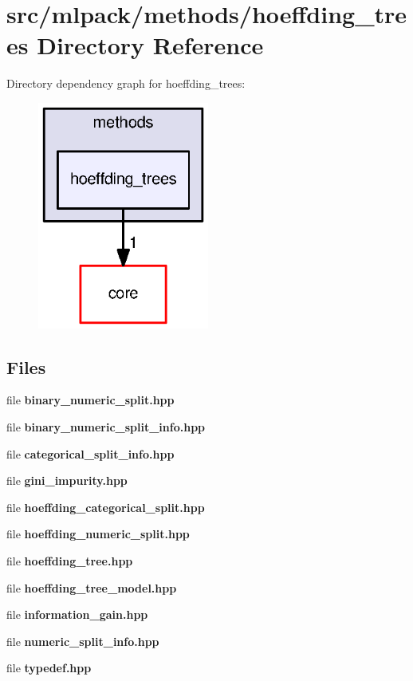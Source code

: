 \section{src/mlpack/methods/hoeffding\+\_\+trees Directory Reference}
\label{dir_9728dd99c5f8edcf7fb9ef7255873dbb}
Directory dependency graph for hoeffding\+\_\+trees\+:
\nopagebreak
\begin{figure}[H]
\begin{center}
\leavevmode
\includegraphics[width=160pt]{dir_9728dd99c5f8edcf7fb9ef7255873dbb_dep}
\end{center}
\end{figure}
\subsection*{Files}
\begin{DoxyCompactItemize}
\item 
file {\bf binary\+\_\+numeric\+\_\+split.\+hpp}
\item 
file {\bf binary\+\_\+numeric\+\_\+split\+\_\+info.\+hpp}
\item 
file {\bf categorical\+\_\+split\+\_\+info.\+hpp}
\item 
file {\bf gini\+\_\+impurity.\+hpp}
\item 
file {\bf hoeffding\+\_\+categorical\+\_\+split.\+hpp}
\item 
file {\bf hoeffding\+\_\+numeric\+\_\+split.\+hpp}
\item 
file {\bf hoeffding\+\_\+tree.\+hpp}
\item 
file {\bf hoeffding\+\_\+tree\+\_\+model.\+hpp}
\item 
file {\bf information\+\_\+gain.\+hpp}
\item 
file {\bf numeric\+\_\+split\+\_\+info.\+hpp}
\item 
file {\bf typedef.\+hpp}
\end{DoxyCompactItemize}
